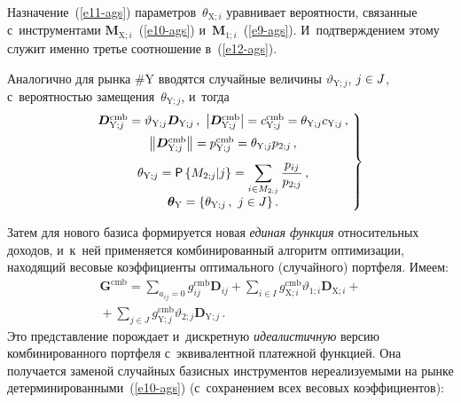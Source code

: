 \begin{multicols}{2}
  Назначение~(\ref{e11-ags}) параметров~$\theta_{\mathrm{X};i}$ уравнивает 
вероятности, связанные с~инструментами 
$\boldsymbol{M}_{\mathrm{X};i}$~(\ref{e10-ags}) и~$\boldsymbol{M}_{1;i}$~(\ref{e9-ags}). 
И~подтверждением этому служит именно третье соотношение  
в~(\ref{e12-ags}). 
  
  Аналогично для рынка \#Y вводятся случайные величины 
$\vartheta_{\mathrm{Y};j}$, $j\hm\in J$, с~вероятностью 
замещения~$\theta_{\mathrm{Y};j}$, и~тогда
  \begin{equation}
  \left.
  \begin{array}{c}
  \!\hspace*{-2.5mm}\boldsymbol{D}^{\mathrm{cmb}}_{\mathrm{Y};j}=\vartheta_{\mathrm{Y};j} 
\boldsymbol{D}_{\mathrm{Y};j}\,,\
  \left\vert \boldsymbol{D}^{\mathrm{cmb}}_{\mathrm{Y};j}\right\vert = 
c^{\mathrm{cmb}}_{\mathrm{Y};j}=\theta_{\mathrm{Y};j} c_{\mathrm{Y};j}\,,\\[6pt]
  \!\hspace*{-2.5mm}\left\| \boldsymbol{D}^{\mathrm{cmb}}_{\mathrm{Y};j} \right\| = 
p^{\mathrm{cmb}}_{\mathrm{Y};j}=\theta_{\mathrm{Y};j} p_{2;j}\,,\\[6pt]
  \!\hspace*{-2.5mm}\theta_{\mathrm{Y};j} ={\sf P}\left\{ M_{2;j}\vert j\right\} =
  \displaystyle\sum\limits_{i\in M_{2;j}} 
  \fr{p_{ij}}{p_{2;j}}\,,\\
  \!\hspace*{-2.5mm}\boldsymbol{\theta}_{\mathrm{Y}} = \left\{ 
\theta_{\mathrm{Y};j}\,,\ j\in J\right\}.
  \end{array}\!
  \right\}\!\!
  \label{e13-ags}
  \end{equation}
  
  Затем для нового базиса формируется новая \textit{единая функция} 
относительных доходов, и~к~ней применяется комбинированный алгоритм 
оптимизации, находящий весовые коэффициенты оптимального (случайного) 
портфеля. Имеем: 
  \begin{multline}
  \boldsymbol{G}^{\mathrm{cmb}}=\sum\limits_{a_{ij}=0} 
g_{ij}^{\mathrm{cmb}}\boldsymbol{D}_{ij} +
\sum\limits_{i\in I} g^{\mathrm{cmb}}_{\mathrm{X};i} 
\vartheta_{1;i} \boldsymbol{D}_{\mathrm{X};i}+ {}\\
{}+\sum\limits_{j\in J} 
g^{\mathrm{cmb}}_{\mathrm{Y};j} \vartheta_{2;j}\boldsymbol{D}_{\mathrm{Y};j}\,.
  \label{e14-ags}
  \end{multline}
%  
  Это представление порождает и~дискретную \textit{идеалистичную} версию 
комбинированного портфеля с~эквивалентной платежной функцией. Она 
получается заменой случайных базисных инструментов нереализуемыми на 
рынке детерминированными~(\ref{e10-ags}) (с~сохранением всех весовых 
коэффициентов):
{

}
\end{multicols}
